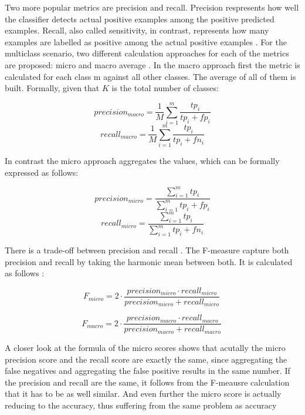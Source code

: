 \documentclass[12pt, a4paper, titlepage]{article}
\begin{document}
Two more popular metrics are precision and recall. Precision respresents how well the classifier detects actual positive examples among the positive predicted examples. Recall, also called sensitivity, in contrast, represents how many examples are labelled as positive among the actual positive examples \citep{Berthold2020}. For the multiclass scenario, two different calculation approaches for each of the metrics are proposed: micro and macro average \citep{Branco2017}. In the macro approach first the metric is calculated for each class m against all other classes. The average of all of them is built. Formally, given that $K$ is the total number of classes: 

\[precision_{macro} = \frac{1}{M} \sum_{i=1}^m \frac{tp_{i}}{tp_{i} + fp_{i}}\]
\[recall_{macro} = \frac{1}{M} \sum_{i=1}^m \frac{tp_{i}}{tp_{i} + fn_{i}}\]

In contrast the micro approach aggregates the values, which can be formally expressed as follows: 

\[precision_{micro} = \frac{\sum_{i=1}^m tp_i}{\sum_{i=1}^m tp_i + fp_i}\]
\[recall_{micro} = \frac{\sum_{i=1}^m tp_i}{\sum_{i=1}^m tp_i + fn_i}\]

There is a trade-off between precision and recall \citep{Buckland1994}. The F-measure capture both precision and recall by taking the harmonic mean between both. It is calculated as follows \citep{Branco2017,Pan2016}:  

\[F_{micro} = 2 \cdot \frac{precision_{micro} \cdot recall_{micro} }{precision_{micro} + recall_{micro} }\ \]

\[F_{macro} = 2 \cdot \frac{precision_{macro} \cdot recall_{macro} }{precision_{macro} + recall_{macro} }\ \]

A closer look at the formula of the micro scores shows that acutally the micro precision score and the recall score are exactly the same, since aggregating the false negatives and aggregating the false positive results in the same number. If the precision and recall are the same, it follows from the F-meausre calculation that it has to be as well similar. And even further the micro score is actually reducing to the accuracy, thus suffering from the same problem as accuracy \citep{grandini2020}

\end{document}
